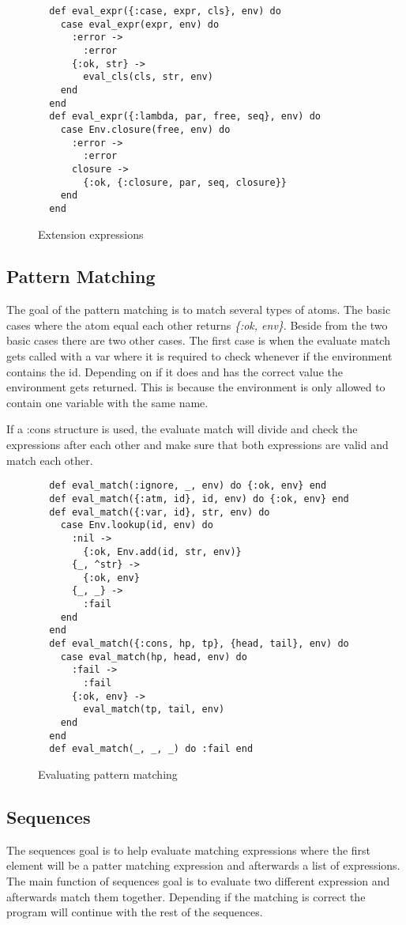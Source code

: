 \documentclass[a4paper,11pt]{article}
\begin{document}
\begin{figure}[H]
\begin{verbatim}
  def eval_expr({:case, expr, cls}, env) do
    case eval_expr(expr, env) do
      :error ->
        :error
      {:ok, str} ->
        eval_cls(cls, str, env)
    end
  end
  def eval_expr({:lambda, par, free, seq}, env) do
    case Env.closure(free, env) do
      :error ->
        :error
      closure ->
        {:ok, {:closure, par, seq, closure}}
    end
  end
\end{verbatim}
\caption{Extension expressions}
\label{Figure:3}
\end{figure}


\subsection*{Pattern Matching}
The goal of the pattern matching is to match several types of atoms. The basic cases where the atom equal each other returns \textit{\{:ok, env\}}. Beside from the two basic cases there are two other cases. The first case is when the evaluate match gets called with a var where it is required to check whenever if the environment contains the id. Depending on if it does and has the correct value the environment gets returned. This is because the environment is only allowed to contain one variable with the same name.

If a :cons structure is used, the evaluate match will divide and check the expressions after each other and make sure that both expressions are valid and match each other.

\begin{figure}[H]
\begin{verbatim}
  def eval_match(:ignore, _, env) do {:ok, env} end
  def eval_match({:atm, id}, id, env) do {:ok, env} end
  def eval_match({:var, id}, str, env) do
    case Env.lookup(id, env) do
      :nil ->
        {:ok, Env.add(id, str, env)}
      {_, ^str} ->
        {:ok, env}
      {_, _} ->
        :fail
    end
  end
  def eval_match({:cons, hp, tp}, {head, tail}, env) do
    case eval_match(hp, head, env) do
      :fail ->
        :fail
      {:ok, env} ->
        eval_match(tp, tail, env)
    end
  end
  def eval_match(_, _, _) do :fail end
\end{verbatim}
\caption{Evaluating pattern matching}
\label{Figure:4}
\end{figure}

\subsection*{Sequences}
The sequences goal is to help evaluate matching expressions where the first element will be a patter matching expression and afterwards a list of expressions. The main function of sequences goal is to evaluate two different expression and afterwards match them together. Depending if the matching is correct the program will continue with the rest of the sequences.
\end{document}
